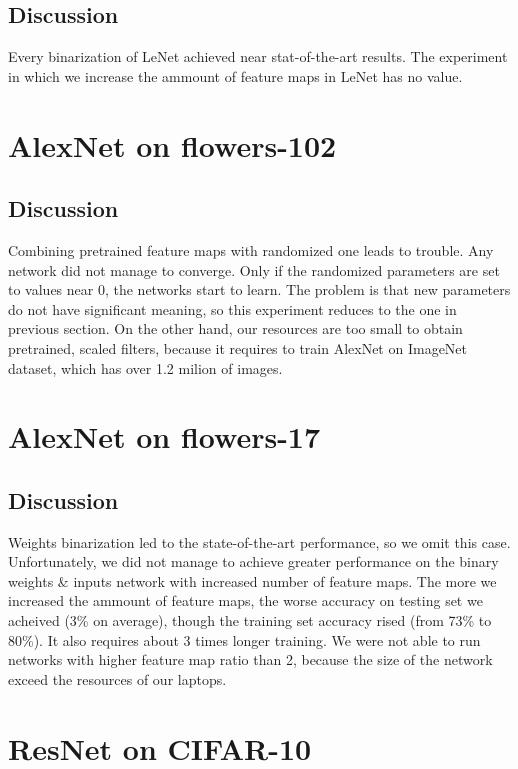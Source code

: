 \documentclass[licencjacka]{pracamgr}
\begin{document}
	\subsection{Discussion}
	Every binarization of LeNet achieved near stat-of-the-art results. The experiment in which we increase the ammount of feature maps in LeNet has no value.
	\section{AlexNet on flowers-102}
	\subsection{Discussion}
	Combining pretrained feature maps with randomized one leads to trouble. Any network did not manage to converge. Only if the randomized parameters are set to values near 0, the networks start to learn. The problem is that new parameters do not have significant meaning, so this experiment reduces to the one in previous section. On the other hand, our resources are too small to obtain pretrained, scaled filters, because it requires to train AlexNet on ImageNet dataset, which has over 1.2 milion of images.
	\section{AlexNet on flowers-17}
	\subsection{Discussion}
	Weights binarization led to the state-of-the-art performance, so we omit this case. Unfortunately, we did not manage to achieve greater performance on the binary weights \& inputs network with increased number of feature maps. The more we increased the ammount of feature maps, the worse accuracy on testing set we acheived (3\% on average), though the training set accuracy rised (from 73\% to 80\%). It also requires about 3 times longer training.  We were not able to run networks with higher feature map ratio than 2, because the size of the network exceed the resources of our laptops.
	\section{ResNet on CIFAR-10}
\end{document}
